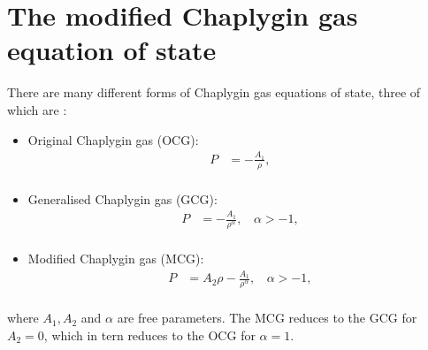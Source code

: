 \documentclass[a4paper, 11pt]{FSKH_623_Report}
\numberwithin{equation}{section}
\begin{document}
\section{The modified Chaplygin gas equation of state}
\renewcommand{\baselinestretch}{0.5}
There are many different forms of Chaplygin gas equations of state, three of which are \citep{kahya2015universe}:
\begin{itemize}
\item Original Chaplygin gas (OCG):
\begin{equation}\label{eq:OCG}
\begin{split}
P &= -\frac{A_{1}}{\rho},         \\
\end{split}
\end{equation}
\item Generalised Chaplygin gas (GCG):
\begin{equation}\label{eq:GCG}
\begin{split}
P &= -\frac{A_{1}}{\rho^{\alpha}},\ \ \ \ \alpha>-1,         \\
\end{split}
\end{equation}
\item Modified Chaplygin gas (MCG):
\begin{equation}\label{eq:MCG}
\begin{split}
P &=A_{2}\rho -\frac{A_{1}}{\rho^{\alpha}},\ \ \ \ \alpha>-1,         \\
\end{split}
\end{equation}
\end{itemize}
\renewcommand{\baselinestretch}{1.3}
where $A_{1},A_{2}$ and $\alpha$ are free parameters. The MCG reduces to the GCG for $A_{2}=0$, which in tern reduces to the OCG for $\alpha=1$.
\end{document}
